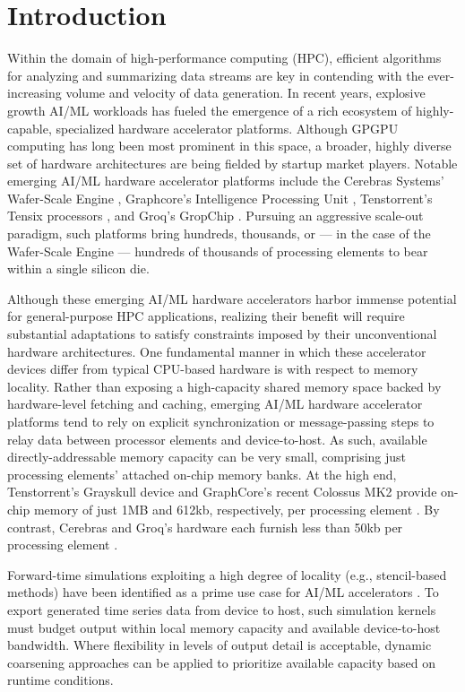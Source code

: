 \section{Introduction} \label{sec:introduction}

Within the domain of high-performance computing (HPC), efficient algorithms for analyzing and summarizing data streams are key in contending with the ever-increasing volume and velocity of data generation.
In recent years, explosive growth AI/ML workloads has fueled the emergence of a rich ecosystem of highly-capable, specialized hardware accelerator platforms.
Although GPGPU computing has long been most prominent in this space, a broader, highly diverse set of hardware architectures are being fielded by startup market players.
Notable emerging AI/ML hardware accelerator platforms include the Cerebras Systems' Wafer-Scale Engine \citep{lie2023cerebras}, Graphcore's Intelligence Processing Unit \citep{gepner2024performance}, Tenstorrent's Tensix processors \citep{vasiljevic2021compute}, and Groq's GropChip \citep{abts2022groq}.
Pursuing an aggressive scale-out paradigm, such platforms bring hundreds, thousands, or --- in the case of the Wafer-Scale Engine --- hundreds of thousands of processing elements to bear within a single silicon die.

Although these emerging AI/ML hardware accelerators harbor immense potential for general-purpose HPC applications, realizing their benefit will require substantial adaptations to satisfy constraints imposed by their unconventional hardware architectures.
One fundamental manner in which these accelerator devices differ from typical CPU-based hardware is with respect to memory locality.
Rather than exposing a high-capacity shared memory space backed by hardware-level fetching and caching, emerging AI/ML hardware accelerator platforms tend to rely on explicit synchronization or message-passing steps to relay data between processor elements and device-to-host.
As such, available directly-addressable memory capacity can be very small, comprising just processing elements' attached on-chip memory banks.
At the high end, Tenstorrent's Grayskull device and GraphCore's recent Colossus MK2 provide on-chip memory of just 1MB and 612kb, respectively, per processing element \citep{vasiljevic2021compute,gepner2024performance}.
By contrast, Cerebras and Groq's hardware each furnish less than 50kb per processing element \citep{lie2023cerebras,abts2022groq}.

Forward-time simulations exploiting a high degree of locality (e.g., stencil-based methods) have been identified as a prime use case for AI/ML accelerators \citep{jacquelin2022scalable,brown2023exploring,brown2024accelerating,louw2021using}.
To export generated time series data from device to host, such simulation kernels must budget output within local memory capacity and available device-to-host bandwidth.
Where flexibility in levels of output detail is acceptable, dynamic coarsening approaches can be applied to prioritize available capacity based on runtime conditions.

